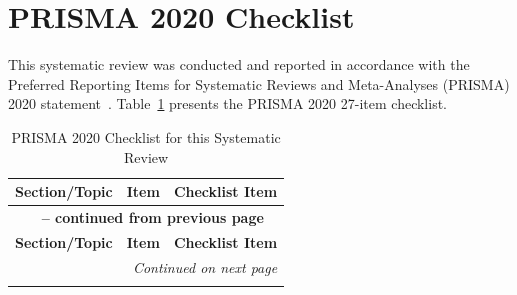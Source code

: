
\appendix

\section{PRISMA 2020 Checklist}
\label{sec:appendix_prisma}

This systematic review was conducted and reported in accordance with the Preferred Reporting Items for Systematic Reviews and Meta-Analyses (PRISMA) 2020 statement~\cite{page2021prisma}. Table~\ref{tab:prisma_checklist} presents the PRISMA 2020 27-item checklist.

\begingroup
\small
\setlength{\tabcolsep}{5pt}
\begin{longtable}{@{}p{100pt}p{35pt}p{295pt}@{}}
\caption{PRISMA 2020 Checklist for this Systematic Review} \label{tab:prisma_checklist} \\
\toprule
\textbf{Section/Topic} & \textbf{Item} & \textbf{Checklist Item} \\
\midrule
\endfirsthead

\multicolumn{3}{c}{{\bfseries \tablename\ \thetable{} -- continued from previous page}} \\
\toprule
\textbf{Section/Topic} & \textbf{Item} & \textbf{Checklist Item} \\
\midrule
\endhead

\midrule
\multicolumn{3}{r}{\textit{Continued on next page}} \\
\bottomrule
\endfoot

\bottomrule
\endlastfoot


\end{longtable}
